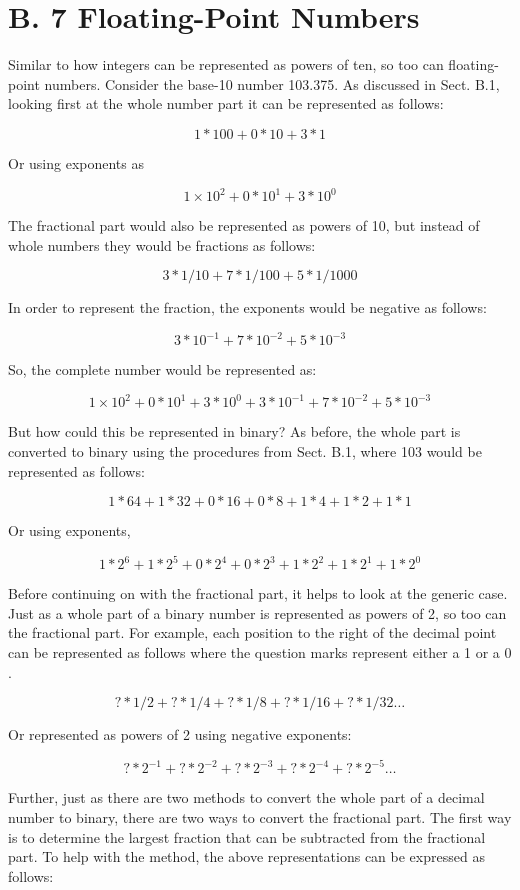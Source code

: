 \documentclass[10pt]{article}
\begin{document}
\section*{B. 7 Floating-Point Numbers}
Similar to how integers can be represented as powers of ten, so too can floating-point numbers. Consider the base-10 number 103.375. As discussed in Sect. B.1, looking first at the whole number part it can be represented as follows:

$$
1 * 100+0 * 10+3 * 1
$$

Or using exponents as

$$
1 \times 10^{2}+0 * 10^{1}+3 * 10^{0}
$$

The fractional part would also be represented as powers of 10, but instead of whole numbers they would be fractions as follows:

$$
3 * 1 / 10+7 * 1 / 100+5 * 1 / 1000
$$

In order to represent the fraction, the exponents would be negative as follows:

$$
3 * 10^{-1}+7 * 10^{-2}+5 * 10^{-3}
$$

So, the complete number would be represented as:

$$
1 \times 10^{2}+0 * 10^{1}+3 * 10^{0}+3 * 10^{-1}+7 * 10^{-2}+5 * 10^{-3}
$$

But how could this be represented in binary? As before, the whole part is converted to binary using the procedures from Sect. B.1, where 103 would be represented as follows:

$$
1 * 64+1 * 32+0 * 16+0 * 8+1 * 4+1 * 2+1 * 1
$$

Or using exponents,

$$
1 * 2^{6}+1 * 2^{5}+0 * 2^{4}+0 * 2^{3}+1 * 2^{2}+1 * 2^{1}+1 * 2^{0}
$$

Before continuing on with the fractional part, it helps to look at the generic case. Just as a whole part of a binary number is represented as powers of 2, so too can the fractional part. For example, each position to the right of the decimal point can be represented as follows where the question marks represent either a 1 or a 0 .

$$
? * 1 / 2+? * 1 / 4+? * 1 / 8+? * 1 / 16+? * 1 / 32 \ldots
$$

Or represented as powers of 2 using negative exponents:

$$
? * 2^{-1}+? * 2^{-2}+? * 2^{-3}+? * 2^{-4}+? * 2^{-5} \ldots
$$

Further, just as there are two methods to convert the whole part of a decimal number to binary, there are two ways to convert the fractional part. The first way is to determine the largest fraction that can be subtracted from the fractional part. To help with the method, the above representations can be expressed as follows:
\end{document}

